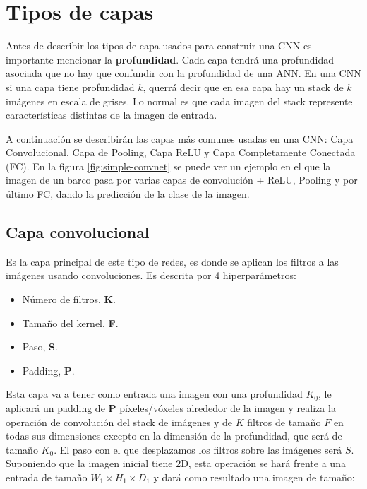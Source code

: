 \section{Tipos de capas}\label{cnn_capas}

Antes de describir los tipos de capa usados para construir una  CNN es importante mencionar la \textbf{profundidad}. Cada capa tendrá una profundidad asociada que no hay que confundir con la profundidad de una ANN. En una CNN si una capa tiene profundidad $k$, querrá decir que en esa capa hay un stack de $k$ imágenes en escala de grises. Lo normal es que cada imagen del stack represente características distintas de la imagen de entrada.

A continuación se describirán las capas más comunes usadas en una CNN: Capa Convolucional, Capa de Pooling, Capa ReLU y Capa Completamente Conectada (FC). En la figura \ref{fig:simple-convnet} \cite{missinglink2020} se puede ver un ejemplo en el que la imagen de un barco pasa por varias capas de convolución + ReLU, Pooling y por último FC, dando la predicción de la clase de la imagen.


\subsection{Capa convolucional}\label{cnn_capa_conv}

Es la capa principal de este tipo de redes, es donde se aplican los filtros a las imágenes usando convoluciones. Es descrita por 4 hiperparámetros:

\begin{itemize}
\item Número de filtros, \textbf{K}.
\item Tamaño del kernel, \textbf{F}.
\item Paso, \textbf{S}.
\item Padding, \textbf{P}.
\end{itemize}

Esta capa va a tener como entrada una imagen con una profundidad $K_0$, le aplicará un padding de \textbf{P} píxeles/vóxeles alrededor de la imagen y realiza la operación de convolución del stack de imágenes y de $K$ filtros de tamaño $F$ en todas sus dimensiones excepto en la dimensión de la profundidad, que será de tamaño $K_0$. El paso con el que desplazamos los filtros sobre las imágenes será $S$. Suponiendo que la imagen inicial tiene 2D, esta operación se hará frente a una entrada de tamaño $W_1 \times H_1 \times D_1$ y dará como resultado una imagen de tamaño:

